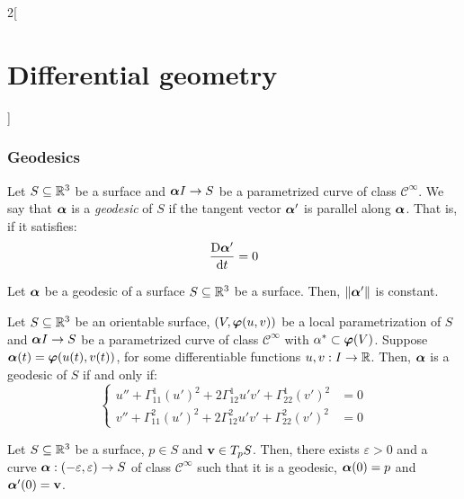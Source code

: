 \documentclass[../../../main_math.tex]{subfiles}
\begin{document}
\begin{multicols}{2}[\section{Differential geometry}]
  \subsubsection{Geodesics}
  \begin{definition}
    Let $S\subseteq\mathbb{R}^3$ be a surface and $\boldsymbol{\mathrm{\alpha}} I\rightarrow S$ be a parametrized curve of class $\mathcal{C}^\infty$. We say that $\boldsymbol{\mathrm{\alpha}}$ is a \emph{geodesic} of $S$ if the tangent vector $\boldsymbol{\mathrm{\alpha}}'$ is parallel along $\boldsymbol{\mathrm{\alpha}}$. That is, if it satisfies: $$\frac{\text{D}\boldsymbol{\mathrm{\alpha}}'}{\dd{t}}=0$$
  \end{definition}
  \begin{proposition}
    Let $\boldsymbol{\mathrm{\alpha}}$ be a geodesic of a surface $S\subseteq\mathbb{R}^3$ be a surface. Then, $\|\boldsymbol{\mathrm{\alpha}}'\|$ is constant.
  \end{proposition}
  \begin{proposition}
    Let $S\subseteq\mathbb{R}^3$ be an orientable surface, $(V,\boldsymbol{\mathrm{\varphi}}(u,v))$ be a local parametrization of $S$ and $\boldsymbol{\mathrm{\alpha}} I\rightarrow S$ be a parametrized curve of class $\mathcal{C}^\infty$ with $\alpha^*\subset\boldsymbol{\mathrm{\varphi}}(V)$. Suppose $\boldsymbol{\mathrm{\alpha}}(t)=\boldsymbol{\mathrm{\varphi}}(u(t),v(t))$, for some differentiable functions $u,v:I\rightarrow\mathbb{R}$. Then, $\boldsymbol{\mathrm{\alpha}}$ is a geodesic of $S$ if and only if:
    $$\left\{
      \begin{aligned}
        u''+\Gamma_{11}^1{(u')}^2+2\Gamma_{12}^1u'v'+\Gamma_{22}^1{(v')}^2 & =0 \\
        v''+\Gamma_{11}^2{(u')}^2+2\Gamma_{12}^2u'v'+\Gamma_{22}^2{(v')}^2 & =0
      \end{aligned}
      \right.
    $$
  \end{proposition}
  \begin{proposition}
    Let $S\subseteq\mathbb{R}^3$ be a surface, $p\in S$ and $\boldsymbol{\mathrm{v}}\in T_pS$. Then, there exists $\varepsilon>0$ and a curve $\boldsymbol{\mathrm{\alpha}}:(-\varepsilon,\varepsilon)\rightarrow S$ of class $\mathcal{C}^\infty$ such that it is a geodesic, $\boldsymbol{\mathrm{\alpha}}(0)=p$ and $\boldsymbol{\mathrm{\alpha}}'(0)=\boldsymbol{\mathrm{v}}$.
  \end{proposition}

\end{multicols}
\end{document}
